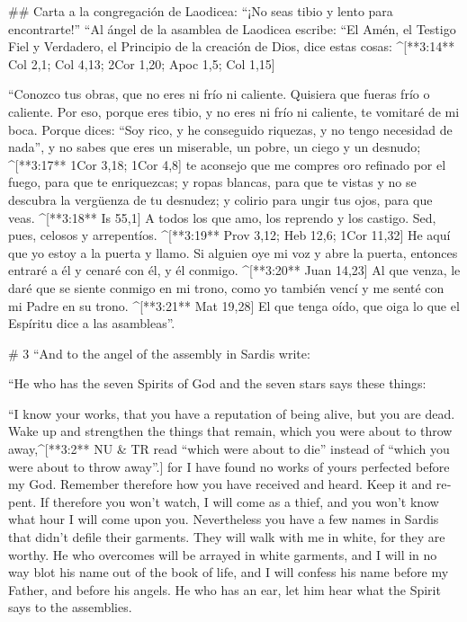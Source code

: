 \begin{paracols}{2}
## Carta a la congregación de Laodicea: “¡No seas tibio y lento para encontrarte!”
 “Al ángel de la asamblea de Laodicea escribe: “El Amén, el Testigo Fiel y Verdadero, el Principio de la creación de Dios, dice estas cosas: ^[**3:14** Col 2,1; Col 4,13; 2Cor 1,20; Apoc 1,5; Col 1,15]

 “Conozco tus obras, que no eres ni frío ni caliente. Quisiera que fueras frío o caliente.  Por eso, porque eres tibio, y no eres ni frío ni caliente, te vomitaré de mi boca.  Porque dices: “Soy rico, y he conseguido riquezas, y no tengo necesidad de nada”, y no sabes que eres un miserable, un pobre, un ciego y un desnudo; ^[**3:17** 1Cor 3,18; 1Cor 4,8]  te aconsejo que me compres oro refinado por el fuego, para que te enriquezcas; y ropas blancas, para que te vistas y no se descubra la vergüenza de tu desnudez; y colirio para ungir tus ojos, para que veas. ^[**3:18** Is 55,1]  A todos los que amo, los reprendo y los castigo. Sed, pues, celosos y arrepentíos. ^[**3:19** Prov 3,12; Heb 12,6; 1Cor 11,32]  He aquí que yo estoy a la puerta y llamo. Si alguien oye mi voz y abre la puerta, entonces entraré a él y cenaré con él, y él conmigo. ^[**3:20** Juan 14,23]  Al que venza, le daré que se siente conmigo en mi trono, como yo también vencí y me senté con mi Padre en su trono. ^[**3:21** Mat 19,28]  El que tenga oído, que oiga lo que el Espíritu dice a las asambleas”. 

\switchcolumn
\begin{english}

# 3
 “And to the angel of the assembly in Sardis write: 

“He who has the seven Spirits of God and the seven stars says these things: 

“I know your works, that you have a reputation of being alive, but you are dead.  Wake up and strengthen the things that remain, which you were about to throw away,^[**3:2** NU & TR read “which were about to die” instead of “which you were about to throw away”.] for I have found no works of yours perfected before my God.  Remember therefore how you have received and heard. Keep it and repent. If therefore you won’t watch, I will come as a thief, and you won’t know what hour I will come upon you.  Nevertheless you have a few names in Sardis that didn’t defile their garments. They will walk with me in white, for they are worthy.  He who overcomes will be arrayed in white garments, and I will in no way blot his name out of the book of life, and I will confess his name before my Father, and before his angels.  He who has an ear, let him hear what the Spirit says to the assemblies. 


\end{english}
\end{paracols}
